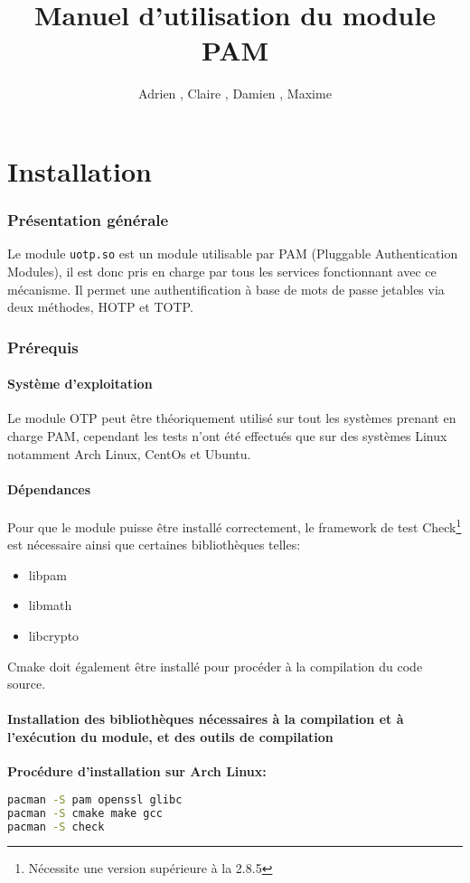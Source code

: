 \documentclass{"../../../res/univ-projet"}
\title{Manuel d'utilisation du module PAM}
\author{Adrien \bsc{Smondack}, Claire \bsc{Hardouin}, Damien \bsc{Picard}, Maxime \bsc{Michotte}}
\begin{document}
\maketitle
\tableofcontents

\newpage

\part{Installation}
\section{Présentation générale}
Le module \verb?uotp.so? est un module utilisable par PAM (Pluggable Authentication Modules), 
il est donc pris en charge par tous les services fonctionnant avec ce mécanisme. Il permet 
une authentification à base de mots de passe jetables via deux méthodes, HOTP et TOTP.

\label{prereq}
\section{Prérequis}
\subsection{Système d'exploitation}
Le module OTP peut être théoriquement utilisé sur tout les systèmes prenant en charge PAM, cependant les tests n'ont été effectués
que sur des systèmes Linux notamment Arch Linux, CentOs et Ubuntu. 

\subsection{Dépendances}
Pour que le module puisse être installé correctement, le framework de test Check\footnote{Nécessite une version supérieure à la 2.8.5} est nécessaire
ainsi que certaines bibliothèques telles:
\begin{itemize}
\item libpam
\item libmath
\item libcrypto
\end{itemize}
Cmake doit également être installé pour procéder à la compilation du code source.

\subsection{Installation des bibliothèques nécessaires à la compilation et à l'exécution du module, et des outils de compilation}
\textbf{Procédure d'installation sur Arch Linux:}\\
\begin{lstlisting}[language=bash, backgroundcolor=\color{black}, basicstyle=\color{white}]
pacman -S pam openssl glibc
pacman -S cmake make gcc
pacman -S check
\end{lstlisting}
\end{document}
